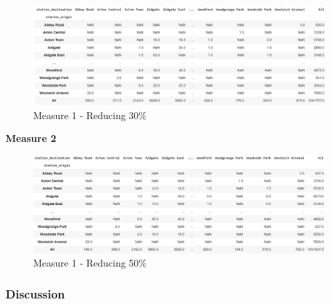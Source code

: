 \documentclass[10pt]{report}
\numberwithin{figure}{section}
\numberwithin{table}{section}
\begin{document}
    \begin{figure}[htp]
        \centering
        \includegraphics[width=16cm]{Image/Part2_OD6_scenario B.png}
        \caption{Measure 1 - Reducing 30\%}
        \label{fig:Part2_OD6_scenario B}
    \end{figure}

\textbf{Measure 2}    


    \begin{figure}[htp]
        \centering
        \includegraphics[width=16cm]{Image/Part2_OD8_scenario B.png}
        \caption{Measure 1 - Reducing 50\%}
        \label{fig:Part2_OD8_scenario B}
    \end{figure}

\newpage    

\subsubsection{Discussion}













\newpage
\printbibliography[title = {References}]
\end{document}
